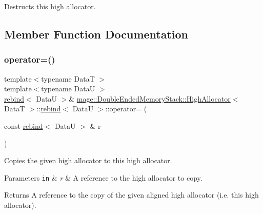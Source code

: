 Destructs this high allocator. 

\subsection{Member Function Documentation}
\hypertarget{structmage_1_1_double_ended_memory_stack_1_1_high_allocator_1_1rebind_a3b2599c125b2a1899d300c7f5c041141}{}\label{structmage_1_1_double_ended_memory_stack_1_1_high_allocator_1_1rebind_a3b2599c125b2a1899d300c7f5c041141} 
\subsubsection{\texorpdfstring{operator=()}{operator=()}\hspace{0.1cm}{\footnotesize\ttfamily [1/2]}}
{\footnotesize\ttfamily template$<$typename DataT $>$ \\
template$<$typename DataU $>$ \\
\hyperlink{structmage_1_1_double_ended_memory_stack_1_1_high_allocator_1_1rebind}{rebind}$<$ DataU $>$\& \hyperlink{structmage_1_1_double_ended_memory_stack_1_1_high_allocator}{mage\+::\+Double\+Ended\+Memory\+Stack\+::\+High\+Allocator}$<$ DataT $>$\+::\hyperlink{structmage_1_1_double_ended_memory_stack_1_1_high_allocator_1_1rebind}{rebind}$<$ DataU $>$\+::operator= (\begin{DoxyParamCaption}\item[{const \hyperlink{structmage_1_1_double_ended_memory_stack_1_1_high_allocator_1_1rebind}{rebind}$<$ DataU $>$ \&}]{r }\end{DoxyParamCaption})\hspace{0.3cm}{\ttfamily [delete]}}

Copies the given high allocator to this high allocator.


\begin{DoxyParams}[1]{Parameters}
\mbox{\tt in}  & {\em r} & A reference to the high allocator to copy. \\
\hline
\end{DoxyParams}
\begin{DoxyReturn}{Returns}
A reference to the copy of the given aligned high allocator (i.\+e. this high allocator). 
\end{DoxyReturn}
\hypertarget{structmage_1_1_double_ended_memory_stack_1_1_high_allocator_1_1rebind_a5170f26b07ec13b8f2dd5d7a5e6f6d46}{}\label{structmage_1_1_double_ended_memory_stack_1_1_high_allocator_1_1rebind_a5170f26b07ec13b8f2dd5d7a5e6f6d46} 
